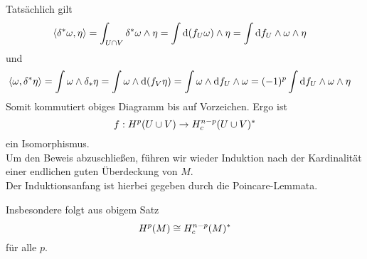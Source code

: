 \begin{Beweis}{}
\[\]
Tatsächlich gilt
\begin{align*}
\left<\delta^* \omega, \eta\right> = \int_{U\cap V} \delta^*\omega \wedge \eta 
&= \int \text{d}(f_U\omega) \wedge \eta
= \int \text{d} f_U \wedge \omega \wedge \eta
\end{align*}
und
\begin{align*}
\left<\omega, \delta^* \eta\right>=\int \omega \wedge \delta_* \eta 
&= \int \omega \wedge \text{d}  (f_V \eta)
 = \int \omega \wedge \text{d} f_U \wedge \omega
 =(-1)^p \int \text{d} f_U \wedge \omega \wedge \eta
\end{align*}
Somit kommutiert obiges Diagramm bis auf Vorzeichen. Ergo ist 
\[f : H^p{(U\cup V)} \overset{}{\rightarrow} H^{n-p}_c(U\cup V)^*\]
ein Isomorphismus.\\
Um den Beweis abzuschließen, führen wir wieder Induktion nach der Kardinalität einer endlichen guten Überdeckung von $M$.\\
Der Induktionsanfang ist hierbei gegeben durch die Poincare-Lemmata.
\end{Beweis}

\Kor{}
Insbesondere folgt aus obigem Satz
\[ H^p(M) \overset{}{\cong} H^{n-p}_c(M)^* \]
für alle $p$.